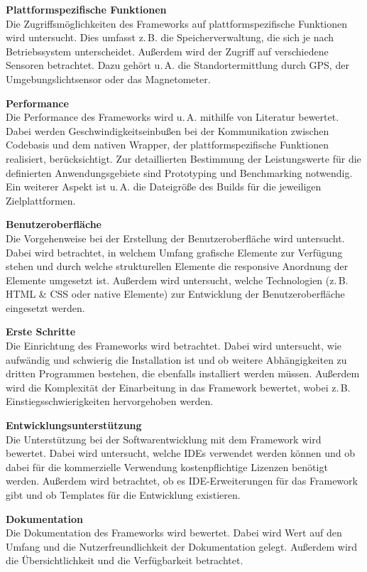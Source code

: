 \documentclass[]{lni}
\begin{document}
\textbf{Plattformspezifische Funktionen}\\
Die Zugriffsmöglichkeiten des Frameworks auf plattformspezifische Funktionen wird untersucht. Dies umfasst z.\,B. die Speicherverwaltung, die sich je nach Betriebssystem unterscheidet. Außerdem wird der Zugriff auf verschiedene Sensoren betrachtet. Dazu gehört u.\,A. die Standortermittlung durch GPS, der Umgebungslichtsensor oder das Magnetometer.

\textbf{Performance}\\
Die Performance des Frameworks wird u.\,A. mithilfe von Literatur bewertet. Dabei werden Geschwindigkeitseinbußen bei der Kommunikation zwischen Codebasis und dem nativen Wrapper, der plattformspezifische Funktionen realisiert, berücksichtigt. Zur detaillierten Bestimmung der Leistungswerte für die definierten Anwendungsgebiete sind Prototyping und Benchmarking notwendig. Ein weiterer Aspekt ist u.\,A. die Dateigröße des Builds für die jeweiligen Zielplattformen.

\textbf{Benutzeroberfläche}\\
Die Vorgehenweise bei der Erstellung der Benutzeroberfläche wird untersucht. Dabei wird betrachtet, in welchem Umfang grafische Elemente zur Verfügung stehen und durch welche strukturellen Elemente die responsive Anordnung der Elemente umgesetzt ist. Außerdem wird untersucht, welche Technologien (z.\,B. HTML \& CSS oder native Elemente) zur Entwicklung der Benutzeroberfläche eingesetzt werden.

\textbf{Erste Schritte}\\
Die Einrichtung des Frameworks wird betrachtet. Dabei wird untersucht, wie aufwändig und schwierig die Installation ist und ob weitere Abhängigkeiten zu dritten Programmen bestehen, die ebenfalls installiert werden müssen. Außerdem wird die Komplexität der Einarbeitung in das Framework bewertet, wobei z.\,B. Einstiegsschwierigkeiten hervorgehoben werden.  

\textbf{Entwicklungsunterstützung}\\
Die Unterstützung bei der Softwarentwicklung mit dem Framework wird bewertet. Dabei wird untersucht, welche IDEs verwendet werden können und ob dabei für die kommerzielle Verwendung kostenpflichtige Lizenzen benötigt werden. Außerdem wird betrachtet, ob es IDE-Erweiterungen für das Framework gibt und ob Templates für die Entwicklung existieren.

\textbf{Dokumentation}\\
Die Dokumentation des Frameworks wird bewertet. Dabei wird Wert auf den Umfang und die Nutzerfreundlichkeit der Dokumentation gelegt. Außerdem wird die Übersichtlichkeit und die Verfügbarkeit betrachtet.
\end{document}
